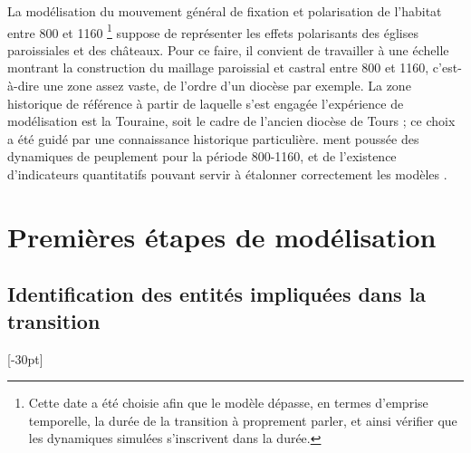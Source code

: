 La modélisation du mouvement général de fixation et polarisation de l'habitat entre 800 et 1160 \footnote{
	Cette date a été choisie afin que le modèle dépasse, en termes d’emprise temporelle, la durée de la transition à proprement parler, et ainsi vérifier que les dynamiques simulées s’inscrivent dans la durée.
} suppose de représenter les effets polarisants des églises paroissiales et des châteaux.
Pour ce faire, il convient de travailler à une échelle montrant la construction du maillage paroissial et castral entre 800 et 1160, c'est-à-dire une zone assez vaste, de l'ordre d'un diocèse par exemple.
La zone historique de référence à partir de laquelle s'est engagée l'expérience de modélisation est la Touraine, soit le cadre de l'ancien diocèse de Tours ; ce choix a été guidé par une connaissance historique particulière.
ment poussée des dynamiques de peuplement pour la période 800-1160, et de l'existence d'indicateurs quantitatifs pouvant servir à étalonner correctement les modèles \autocite{zadora-rio_paroisses_2008}.

\section{Premières étapes de modélisation}

\subsection{Identification des entités impliquées dans la transition}[-30pt]

